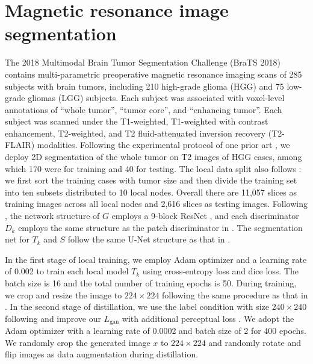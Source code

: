 \documentclass[letterpaper]{article} %
\begin{document}
\section{Magnetic resonance image segmentation}
The 2018 Multimodal Brain Tumor Segmentation Challenge (BraTS 2018)~\cite{menze2014multimodal, bakas2018identifying} contains multi-parametric preoperative magnetic resonance imaging scans of 285 subjects with brain tumors, including 210 high-grade glioma (HGG) and 75 low-grade gliomas (LGG) subjects. 
Each subject was associated with voxel-level annotations of “whole tumor”, “tumor core”, and “enhancing tumor”. Each subject was scanned under the T1-weighted, T1-weighted with contrast enhancement, T2-weighted, and T2 fluid-attenuated inversion recovery (T2-FLAIR) modalities. Following the experimental protocol of one prior art \cite{chang2020synthetic}, we deploy 2D segmentation of the whole tumor on T2 images of HGG cases, among which 170 were for training and 40 for testing. The local data split also follows \cite{chang2020synthetic}: we first sort the training cases with tumor size and then divide the training set into ten subsets distributed to 10 local nodes. Overall there are 11,057 slices as training images across all local nodes and 2,616 slices as testing images. Following \cite{chang2020synthetic}, the network structure of $G$ employs a 9-block ResNet \cite{he2016deep}, and each discriminator $D_k$ employs the same structure as the patch discriminator in \cite{isola2017image}. The segmentation net for $T_k$ and $S$ follow the same U-Net \cite{ronneberger2015u} structure as that in \cite{chang2020synthetic}. 

In the first stage of local training,
we employ Adam optimizer and a learning rate of 0.002 to train each local model $T_k$ using cross-entropy loss and dice loss. The batch size is 16 and the total number of training epochs is 50. During training, we crop and resize the image to $224 \times 224$ following the same procedure as that in \cite{chang2020synthetic}. In the second stage of distillation, we use the label condition with size $240 \times 240$ following \cite{chang2020synthetic} and improve our $L_\text{gan}$ with additional perceptual loss \cite{johnson2016perceptual}.
We adopt the Adam optimizer with a learning rate of 0.0002 and batch size of 2 for 400 epochs. We randomly crop the generated image $x$ to $224 \times 224$ and randomly rotate and flip images as data augmentation during distillation. 
\end{document}
